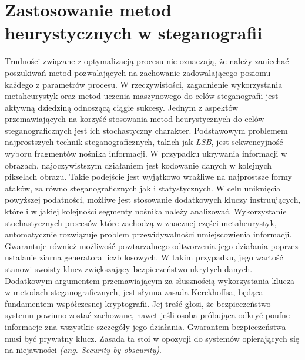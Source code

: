 {    %
    \section{Zastosowanie metod heurystycznych w steganografii}
    {
        Trudności związane z optymalizacją procesu nie oznaczają, że należy zaniechać poszukiwań metod pozwalających na
        zachowanie zadowalającego poziomu każdego z parametrów procesu. W rzeczywistości, zagadnienie wykorzystania
        metaheurystyk oraz metod uczenia maszynowego do celów steganografii jest aktywną dziedziną odnoszącą ciągłe
        sukcesy\cite{ElEmam2013NewSA, Zhao2021AntCO, Khan2018AntCO, Saleema2016ANS, Li2007ASM}.
        Jednym z aspektów przemawiających na korzyść stosowania metod heurystycznych do celów steganograficznych jest
        ich stochastyczny charakter. Podstawowym problemem najprostszych technik steganograficznych, takich jak
        \textit{LSB}, jest sekwencyjność wyboru fragmentów nośnika informacji. W przypadku ukrywania informacji w
        obrazach, najoczywistszym działaniem jest kodowanie danych w kolejnych pikselach obrazu. Takie podejście jest
        wyjątkowo wrażliwe na najprostsze formy ataków, za równo steganograficznych jak i statystycznych. W celu
        uniknięcia powyższej podatności, możliwe jest stosowanie dodatkowych kluczy instruujących, które i w jakiej
        kolejności segmenty nośnika należy analizować\cite{AlHusainy2019ASI}. Wykorzystanie stochastycznych procesów
        które zachodzą w znacznej części metaheurystyk, automatycznie rozwiązuje problem przewidywalności umiejscowienia
        informacji. Gwarantuje również możliwość powtarzalnego odtworzenia jego działania poprzez ustalanie ziarna
        generatora liczb losowych. W takim przypadku, jego wartość stanowi swoisty klucz zwiększający bezpieczeństwo
        ukrytych danych.
        Dodatkowym argumentem przemawiającym za słusznością wykorzystania klucza w metodach steganograficznych, jest
        słynna zasada Kerckhoffsa\cite{Guillot2013AugusteKE}, będąca fundamentem współczesnej kryptografii. Jej treść
        głosi, że bezpieczeństwo systemu powinno zostać zachowane, nawet jeśli osoba próbująca odkryć poufne informacje
        zna wszystkie szczegóły jego działania. Gwarantem bezpieczeństwa musi być prywatny klucz. Zasada ta stoi w
        opozycji do systemów opierających się na niejawności \textit{(ang. Security by obscurity)}.

}}
